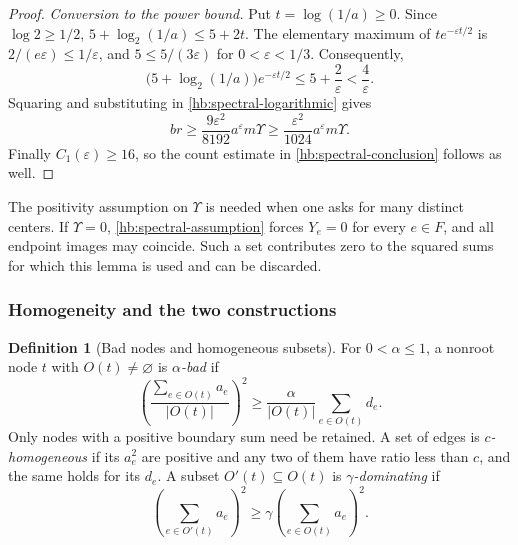 \documentclass[11pt]{amsart}
\theoremstyle{definition}
\newtheorem{definition}[theorem]{Definition}
\theoremstyle{remark}
\numberwithin{equation}{section}
\begin{document}
\begin{proof}
\smallskip
\noindent\emph{Conversion to the power bound.}
Put \(t=\log(1/a)\ge0\).  Since \(\log2\ge1/2\),
\(5+\log_2(1/a)\le5+2t\).
The elementary maximum of \(t e^{-\varepsilon t/2}\) is
\(2/(e\varepsilon)\le1/\varepsilon\), and
\(5\le5/(3\varepsilon)\) for \(0<\varepsilon<1/3\).
Consequently,
\[
 \bigl(5+\log_2(1/a)\bigr)e^{-\varepsilon t/2}
 \le5+\frac2\varepsilon<\frac4\varepsilon.
\]
Squaring and substituting in \eqref{hb:spectral-logarithmic} gives
\[
 br\ge\frac{9\varepsilon^2}{8192}
       a^\varepsilon m\Upsilon
 \ge\frac{\varepsilon^2}{1024}
       a^\varepsilon m\Upsilon.
\]
Finally \(C_1(\varepsilon)\ge16\), so the count estimate in
\eqref{hb:spectral-conclusion} follows as well.
\end{proof}

The positivity assumption on \(\Upsilon\) is needed when one asks for
many distinct centers.  If \(\Upsilon=0\),
\eqref{hb:spectral-assumption} forces \(Y_e=0\) for every \(e\in F\),
and all endpoint images may coincide.  Such a set contributes zero to
the squared sums for which this lemma is used and can be discarded.


\subsubsection{Homogeneity and the two constructions}

\begin{definition}[Bad nodes and homogeneous subsets]\label{hb:bad}
For $0<\alpha\le1$, a nonroot node $t$ with $O(t)\ne\varnothing$
is \emph{$\alpha$-bad} if
\[
 \left(\frac{\sum_{e\in O(t)}a_e}{|O(t)|}\right)^2
 \ge\frac{\alpha}{|O(t)|}\sum_{e\in O(t)}d_e.
\]
Only nodes with a positive boundary sum need be retained.
A set of edges is \emph{$c$-homogeneous} if its $a_e^2$ are positive
and any two of them have ratio less than $c$, and the same holds for
its $d_e$.  A subset $O'(t)\subseteq O(t)$ is
\emph{$\gamma$-dominating} if
\[
 \left(\sum_{e\in O'(t)}a_e\right)^2
 \ge\gamma\left(\sum_{e\in O(t)}a_e\right)^2.
\]
\end{definition}
\end{document}
